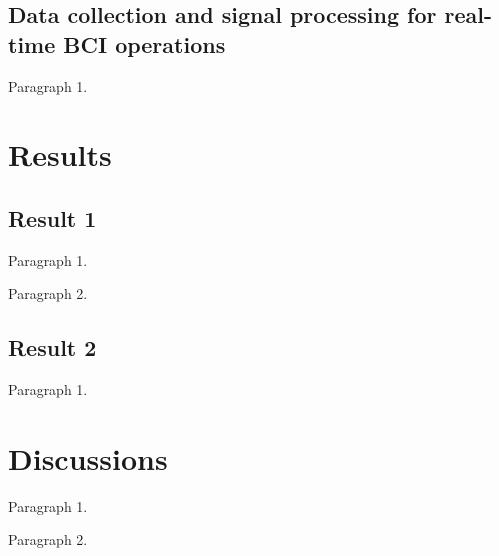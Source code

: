\documentclass[10pt,]{article}
\begin{document}
\subsection{Data collection and signal processing for real-time BCI operations}
Paragraph 1.

\section{Results}
\subsection{Result 1}
Paragraph 1.

Paragraph 2.

\subsection{Result 2}
Paragraph 1.
\section{Discussions}
Paragraph 1.

Paragraph 2.
\newpage\clearpage

\renewcommand\refname{References}

\newpage
\end{document}
